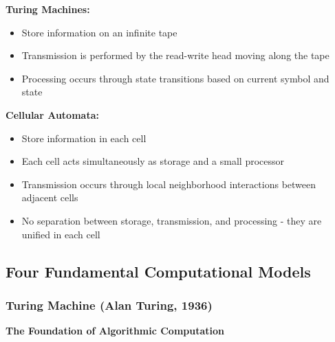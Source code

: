 \textbf{Turing Machines:}

\begin{itemize}
\item Store information on an infinite tape
\item Transmission is performed by the read-write head moving along the tape
\item Processing occurs through state transitions based on current symbol and state
\end{itemize}

\textbf{Cellular Automata:}

\begin{itemize}
\item Store information in each cell
\item Each cell acts simultaneously as storage and a small processor
\item Transmission occurs through local neighborhood interactions between adjacent cells
\item No separation between storage, transmission, and processing - they are unified in each cell
\end{itemize}

\subsection{Four Fundamental Computational Models}

\subsubsection{Turing Machine (Alan Turing, 1936)}

\textbf{The Foundation of Algorithmic Computation}


